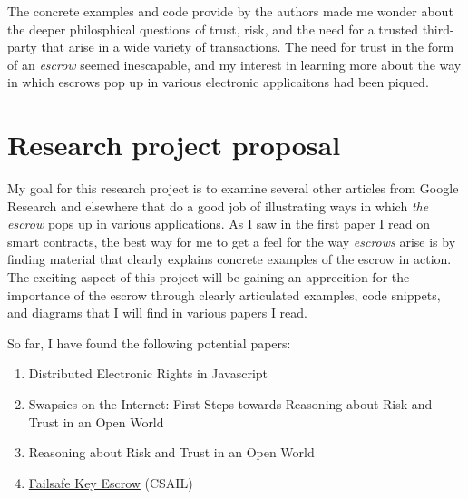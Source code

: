 \documentclass[a4paper, 11pt]{article} %
\begin{document}
The concrete examples and code provide by the authors made me wonder about the deeper philosphical questions of trust, risk, and the need for a trusted third-party that arise in a wide variety of transactions. The need for trust in the form of an \textit{escrow} seemed inescapable, and my interest in learning more about the way in which escrows pop up in various electronic applicaitons had been piqued.

\section*{Research project proposal}

My goal for this research project is to examine several other articles from Google Research and elsewhere that do a good job of illustrating ways in which \textit{the escrow} pops up in various applications. As I saw in the first paper I read on smart contracts, the best way for me to get a feel for the way \textit{escrows} arise is by finding material that clearly explains concrete examples of the escrow in action. The exciting aspect of this project will be gaining an apprecition for the importance of the escrow through clearly articulated examples, code snippets, and diagrams that I will find in various papers I read.

So far, I have found the following potential papers:

\begin{enumerate}
	\item Distributed Electronic Rights in Javascript \cite{40673}
	\item Swapsies on the Internet: First Steps towards Reasoning about Risk and Trust in an Open World \cite{43808}
	
	\item Reasoning about Risk and Trust in an Open World \cite{44272}
	
	\item \href{http://publications.csail.mit.edu/lcs/pubs/pdf/MIT-LCS-TR-636.pdf}{Failsafe Key Escrow} (CSAIL)
\end{enumerate}









\end{document}
